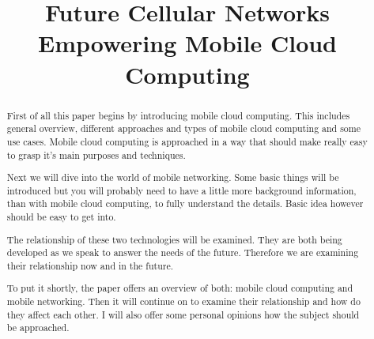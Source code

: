 \documentclass[conference]{IEEEtran}
\begin{document}
\title{Future Cellular Networks Empowering Mobile Cloud Computing}

\author{
}

\maketitle

\begin{abstract}
First of all this paper begins by introducing mobile cloud computing. This includes general overview, different approaches and types of mobile cloud computing and some use cases. Mobile cloud computing is approached in a way that should make really easy to grasp it's main purposes and techniques.
\par
Next we will dive into the world of mobile networking. Some basic things will be introduced but you will probably need to have a little more background information, than with mobile cloud computing, to fully understand the details. Basic idea however should be easy to get into.
\par
The relationship of these two technologies will be examined. They are both being developed as we speak to answer the needs of the future. Therefore we are examining their relationship now and in the future.
\par
To put it shortly, the paper offers an overview of both: mobile cloud computing and mobile networking. Then it will continue on to examine their relationship and how do they affect each other. I will also offer some personal opinions how the subject should be approached.
\end{abstract}
\end{document}

